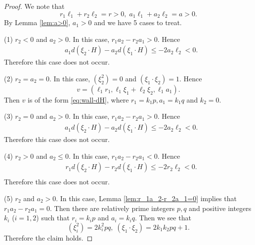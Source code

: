 \documentclass[10pt]{amsart}
\numberwithin{equation}{section}
\theoremstyle{plain}
\theoremstyle{definition}
\theoremstyle{remark}
\begin{document}
\begin{proof}
We note that
$$
r_1 \ell_1+r_2 \ell_2=r>0,\;
a_1 \ell_1+a_2 \ell_2=a>0.
$$
By Lemma \ref{lem:a>0},
$a_1>0$ and
we have 5 cases to treat.



(1) $r_2<0$ and $a_2>0$.
In this case, $r_1 a_2-r_2 a_1 >0$. Hence
\begin{equation}
\begin{split}
& a_1 d(\xi_2 \cdot H)-a_2 d(\xi_1 \cdot H) \leq -2a_2 \ell_2<0.
\end{split}
\end{equation}
Therefore this case does not occur. 


(2)
$r_2=a_2=0$.
In this case,
$(\xi_2^2)=0$ and $(\xi_1 \cdot \xi_2)=1$.
Hence 
$$
v=(\ell_1 r_1,\ell_1 \xi_1+\ell_2 \xi_2,\ell_1 a_1). 
$$
Then $v$ is of the form \eqref{eq:wall-dH}, where   
$r_1=k_1 p, a_1=k_1 q$ and $k_2=0$.

(3)
$r_2=0$ and $a_2>0$.
In this case, $r_1 a_2-r_2 a_1>0$. Hence
\begin{equation}
\begin{split}
& a_1 d(\xi_2 \cdot H)-a_2 d(\xi_1 \cdot H) \leq -2a_2 \ell_2<0.
\end{split}
\end{equation}
Therefore this case does not occur. 

(4)
$r_2>0$ and $a_2 \leq 0$.
In this case, $r_1 a_2-r_2 a_1<0$.
Hence
\begin{equation}
\begin{split}
& r_1 d(\xi_2 \cdot H)-r_2 d(\xi_1 \cdot H) \leq -2r_2 \ell_2<0.\\
\end{split}
\end{equation}
Therefore this case does not occur. 

(5)
$r_2$ and $a_2>0$. In this case,
Lemma \ref{lem:r_1a_2-r_2a_1=0} implies that
$r_1 a_2-r_2 a_1=0$.
Then there are relatively prime integers $p,q$ and positive integers
$k_i$ ($i=1,2$) such that $r_i=k_i p$ and $a_i=k_i q$.
Then we see that
$$
(\xi_i^2)=2k_i^2 pq,\; (\xi_1 \cdot \xi_2)=2k_1 k_2 pq+1.
$$
Therefore the claim holds.
\end{proof}
\end{document}
